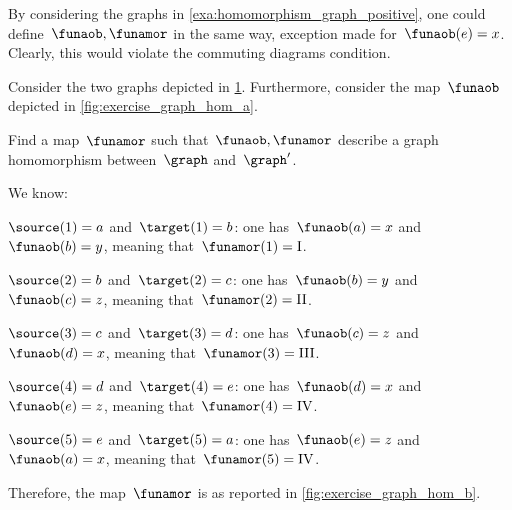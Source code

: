 \begin{example}[Counterexample]
	By considering the graphs in \cref{exa:homomorphism_graph_positive}, one could define~$\funaob,\funamor$ in the same way, exception made for~$\funaob(e)=x$.
	Clearly, this would violate the commuting diagrams condition.
\end{example}

\begin{exercise}
	Consider the two graphs depicted in \cref{fig:ex_graph_hom}.
	Furthermore, consider the map~$\funaob$ depicted in \cref{fig:exercise_graph_hom_a}.
	\begin{figure}[h]
		\centering
		\caption{
			\label{fig:ex_graph_hom}}
	\end{figure}
	\begin{marginfigure}
		\begin{center}
		\end{center}
		\caption{\label{fig:exercise_graph_hom_a}}
	\end{marginfigure}

	Find a map~$\funamor$ such that~$\funaob,\funamor$ describe a graph homomorphism between~$\graph$ and~$\graph'$.
\end{exercise}

\begin{solution}
	We know:
	\begin{compactitem}
		\item $\source(1)=a$ and~$\target(1)=b$: one has~$\funaob(a)=x$ and~$\funaob(b)=y$, meaning that~$\funamor(1)=\text{I}$.
		\item $\source(2)=b$ and~$\target(2)=c$: one has~$\funaob(b)=y$ and~$\funaob(c)=z$, meaning that~$\funamor(2)=\text{II}$.
		\item $\source(3)=c$ and~$\target(3)=d$: one has~$\funaob(c)=z$ and~$\funaob(d)=x$, meaning that~$\funamor(3)=\text{III}$.
		\item $\source(4)=d$ and~$\target(4)=e$: one has~$\funaob(d)=x$ and~$\funaob(e)=z$, meaning that~$\funamor(4)=\text{IV}$.
		\item $\source(5)=e$ and~$\target(5)=a$: one has~$\funaob(e)=z$ and~$\funaob(a)=x$, meaning that~$\funamor(5)=\text{IV}$.
	\end{compactitem}
	Therefore, the map~$\funamor$ is as reported in \cref{fig:exercise_graph_hom_b}.

	\begin{marginfigure}
		\begin{center}
			\includesag{graph_homo_ex_b}
		\end{center}
		\caption{\label{fig:exercise_graph_hom_b}}
	\end{marginfigure}
\end{solution}
